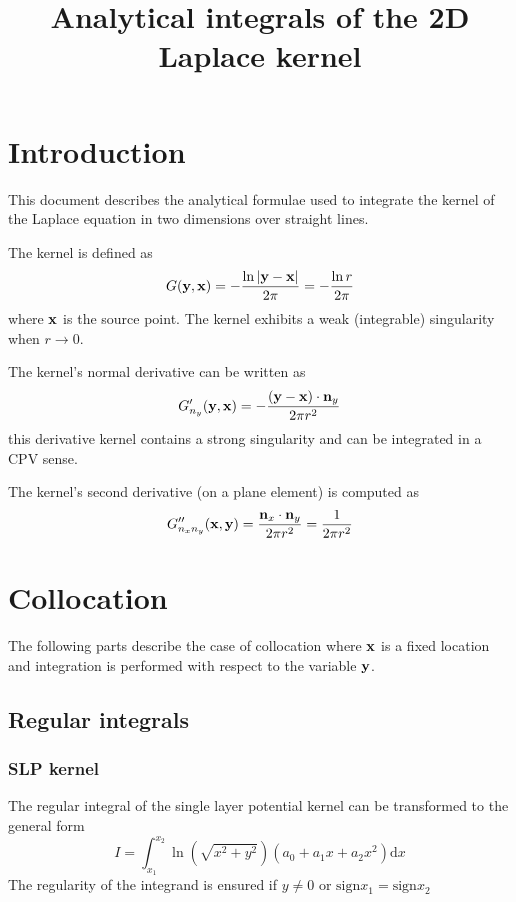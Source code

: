 \documentclass[a4paper,11pt]{article}
\title {Analytical integrals of the 2D Laplace kernel}
\newcommand{\td}{\mathrm{d}}
\newcommand{\sign}{\mathrm{sign}}
\begin{document}
\maketitle

\section{Introduction}

This document describes the analytical formulae used to integrate the kernel of the Laplace equation in two dimensions over straight lines.

The kernel is defined as
%
\begin{equation}
G({\bf y}, {\bf x}) = -\frac{\ln |{\bf y}-{\bf x}|}{2\pi} = -\frac{\ln r}{2\pi}
\end{equation}
%
where ${\bf x}$ is the source point. The kernel exhibits a weak (integrable) singularity when $r \to 0$.

The kernel's normal derivative can be written as
%
\begin{equation}
G'_{n_y}({\bf y}, {\bf x}) = -\frac{({\bf y}-{\bf x}) \cdot {\bf n}_y}{2\pi r^2}
\end{equation}
%
this derivative kernel contains a strong singularity and can be integrated in a CPV sense.

The kernel's second derivative (on a plane element) is computed as
%
\begin{equation}
G''_{n_x n_y}({\bf x}, {\bf y}) = \frac{{\bf n}_x \cdot {\bf n}_y}{2\pi r^2} = \frac{1}{2\pi r^2}
\end{equation}


\section{Collocation}

The following parts describe the case of collocation where ${\bf x}$ is a fixed location and integration is performed with respect to the variable ${\bf y}$.


\subsection{Regular integrals}

\subsubsection{SLP kernel}

The regular integral of the single layer potential kernel can be transformed to the general form
%
\begin{equation}
I = \int_{x_1}^{x_2} \ln\left(\sqrt{x^2+y^2}\right) \left(a_0 + a_1 x + a_2 x^2\right) \td x
\end{equation}
%
The regularity of the integrand is ensured if $y \ne 0$ or $\sign x_1 = \sign x_2$
\end{document}
